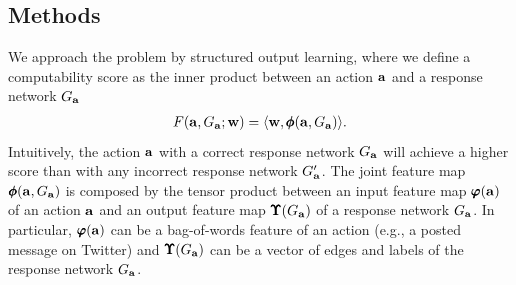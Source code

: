 {%
\subsection{Methods}
We approach the problem by structured output learning, where we define a computability score as the inner product between an action $\mathbf {a}$ and a response network $G_{\mathbf {a}}$
\begin{align*}
	F(\mathbf {a},G_{\mathbf {a}};\mathbf {w}) = \langle \mathbf {w}, \pmb \phi(\mathbf {a},G_{\mathbf {a}}) \rangle.
\end{align*}
Intuitively, the action $\mathbf {a}$ with a correct response network $G_{\mathbf {a}}$ will achieve a higher score than with any incorrect response network $G_{\mathbf {a}}'$.
The joint feature map $\pmb \phi(\mathbf {a},G_{\mathbf {a}})$ is composed by the tensor product between an input feature map $\pmb \varphi(\mathbf {a})$ of an action $\mathbf {a}$  and an output feature map $\pmb \Upsilon(G_{\mathbf {a}})$ of a response network $G_{\mathbf {a}}$.
In particular, $\pmb \varphi(\mathbf {a})$ can be a bag-of-words feature of an action (e.g., a posted message on Twitter) and $\pmb \Upsilon(G_{\mathbf {a}})$ can be a vector of edges and labels of the response network $G_{\mathbf {a}}$.

}
